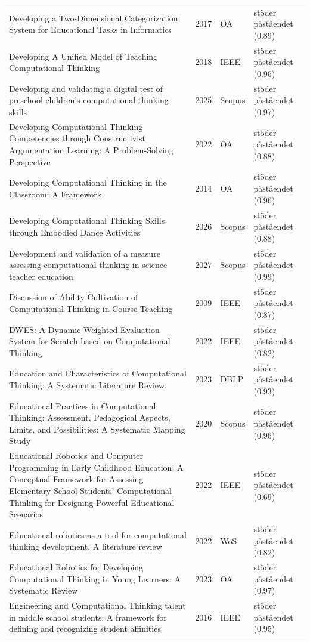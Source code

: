 \begin{longtable}{@{}%
  >{\raggedright\arraybackslash}p{}c%
  >{\raggedright\arraybackslash}p{}%
  >{\raggedright\arraybackslash}p{}@{}}
Developing a Two-Dimensional Categorization System for Educational Tasks in Informatics & 2017 & OA & stöder påståendet (0.89) \\
Developing A Unified Model of Teaching Computational Thinking & 2018 & IEEE & stöder påståendet (0.96) \\
Developing and validating a digital test of preschool children's computational thinking skills & 2025 & Scopus & stöder påståendet (0.97) \\
Developing Computational Thinking Competencies through Constructivist Argumentation Learning: A Problem-Solving Perspective & 2022 & OA & stöder påståendet (0.88) \\
Developing Computational Thinking in the Classroom: A Framework & 2014 & OA & stöder påståendet (0.96) \\
Developing Computational Thinking Skills through Embodied Dance Activities & 2026 & Scopus & stöder påståendet (0.88) \\
Development and validation of a measure assessing computational thinking in science teacher education & 2027 & Scopus & stöder påståendet (0.99) \\
Discussion of Ability Cultivation of Computational Thinking in Course Teaching & 2009 & IEEE & stöder påståendet (0.87) \\
DWES: A Dynamic Weighted Evaluation System for Scratch based on Computational Thinking & 2022 & IEEE & stöder påståendet (0.82) \\
Education and Characteristics of Computational Thinking: A Systematic Literature Review. & 2023 & DBLP & stöder påståendet (0.93) \\
Educational Practices in Computational Thinking: Assessment, Pedagogical Aspects, Limits, and Possibilities: A Systematic Mapping Study & 2020 & Scopus & stöder påståendet (0.96) \\
Educational Robotics and Computer Programming in Early Childhood Education: A Conceptual Framework for Assessing Elementary School Students' Computational Thinking for Designing Powerful Educational Scenarios & 2022 & IEEE & stöder påståendet (0.69) \\
Educational robotics as a tool for computational thinking development. A literature review & 2022 & WoS & stöder påståendet (0.82) \\
Educational Robotics for Developing Computational Thinking in Young Learners: A Systematic Review & 2023 & OA & stöder påståendet (0.97) \\
Engineering and Computational Thinking talent in middle school students: A framework for defining and recognizing student affinities & 2016 & IEEE & stöder påståendet (0.95) \\

\end{longtable}
